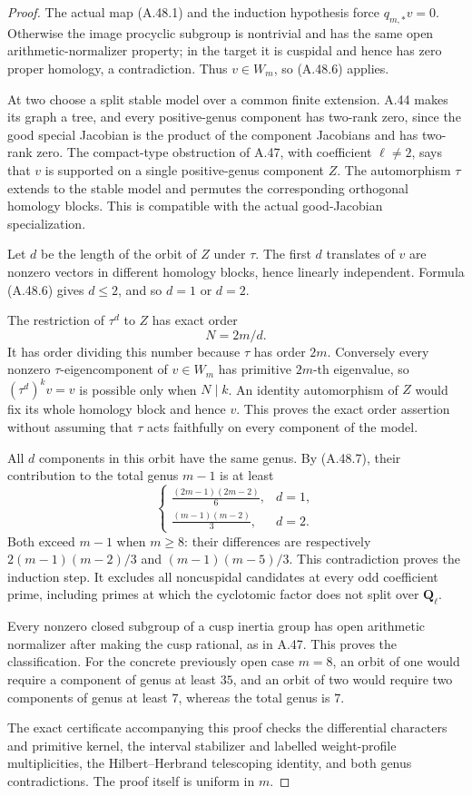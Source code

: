 \begin{proof}
The actual map (A.48.1) and the induction hypothesis
force \(q_{m,*}v=0\). Otherwise the image procyclic
subgroup is nontrivial and has the same open
arithmetic-normalizer property; in the target it is
cuspidal and hence has zero proper homology, a
contradiction. Thus \(v\in W_m\), so (A.48.6)
applies.

At two choose a split stable model over a common
finite extension. A.44 makes its graph a tree, and
every positive-genus component has two-rank zero,
since the good special Jacobian is the product of
the component Jacobians and has two-rank zero. The
compact-type obstruction of A.47, with coefficient
\(\ell\ne2\), says that \(v\) is supported
on a single positive-genus component \(Z\).
The automorphism \(\tau\) extends to the stable
model and permutes the corresponding orthogonal
homology blocks. This is compatible with the actual
good-Jacobian specialization.

Let \(d\) be the length of the orbit of \(Z\)
under \(\tau\). The first \(d\) translates of
\(v\) are nonzero vectors in different homology
blocks, hence linearly independent. Formula
(A.48.6) gives \(d\le2\), and so \(d=1\)
or \(d=2\).

The restriction of \(\tau^d\) to \(Z\) has
exact order
\[
                              N=2m/d.              \tag{A.48.9}
\]
It has order dividing this number because \(\tau\)
has order \(2m\). Conversely every nonzero
\(\tau\)-eigencomponent of \(v\in W_m\)
has primitive \(2m\)-th eigenvalue, so
\((\tau^d)^k v=v\) is possible only when
\(N\mid k\). An identity automorphism of \(Z\)
would fix its whole homology block and hence \(v\).
This proves the exact order assertion without
assuming that \(\tau\) acts faithfully on every
component of the model.

All \(d\) components in this orbit have the same
genus. By (A.48.7), their contribution to the total
genus \(m-1\) is at least
\[
 \begin{cases}
  \displaystyle\frac{(2m-1)(2m-2)}6,&d=1,\\[4pt]
  \displaystyle\frac{(m-1)(m-2)}3,&d=2.
 \end{cases}                                                   \tag{A.48.10}
\]
Both exceed \(m-1\) when \(m\ge8\): their
differences are respectively
\(2(m-1)(m-2)/3\) and \((m-1)(m-5)/3\).
This contradiction proves the induction step.
It excludes all noncuspidal candidates at every odd
coefficient prime, including primes at which the
cyclotomic factor does not split over
\(\mathbf Q_\ell\).

Every nonzero closed subgroup of a cusp inertia
group has open arithmetic normalizer after making
the cusp rational, as in A.47. This proves the
classification. For the concrete previously open
case \(m=8\), an orbit of one would require a
component of genus at least \(35\), and an orbit
of two would require two components of genus at
least \(7\), whereas the total genus is \(7\).

The exact certificate accompanying this proof checks
the differential characters and primitive kernel,
the interval stabilizer and labelled weight-profile
multiplicities, the Hilbert--Herbrand telescoping
identity, and both genus contradictions. The proof
itself is uniform in \(m\).
\end{proof}
